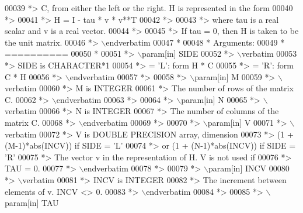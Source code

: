 \begin{DoxyCode}
00039 \textcolor{comment}{*> C, from either the left or the right. H is represented in the form}
00040 \textcolor{comment}{*>}
00041 \textcolor{comment}{*>       H = I - tau * v * v**T}
00042 \textcolor{comment}{*>}
00043 \textcolor{comment}{*> where tau is a real scalar and v is a real vector.}
00044 \textcolor{comment}{*>}
00045 \textcolor{comment}{*> If tau = 0, then H is taken to be the unit matrix.}
00046 \textcolor{comment}{*> \(\backslash\)endverbatim}
00047 \textcolor{comment}{*}
00048 \textcolor{comment}{*  Arguments:}
00049 \textcolor{comment}{*  ==========}
00050 \textcolor{comment}{*}
00051 \textcolor{comment}{*> \(\backslash\)param[in] SIDE}
00052 \textcolor{comment}{*> \(\backslash\)verbatim}
00053 \textcolor{comment}{*>          SIDE is CHARACTER*1}
00054 \textcolor{comment}{*>          = 'L': form  H * C}
00055 \textcolor{comment}{*>          = 'R': form  C * H}
00056 \textcolor{comment}{*> \(\backslash\)endverbatim}
00057 \textcolor{comment}{*>}
00058 \textcolor{comment}{*> \(\backslash\)param[in] M}
00059 \textcolor{comment}{*> \(\backslash\)verbatim}
00060 \textcolor{comment}{*>          M is INTEGER}
00061 \textcolor{comment}{*>          The number of rows of the matrix C.}
00062 \textcolor{comment}{*> \(\backslash\)endverbatim}
00063 \textcolor{comment}{*>}
00064 \textcolor{comment}{*> \(\backslash\)param[in] N}
00065 \textcolor{comment}{*> \(\backslash\)verbatim}
00066 \textcolor{comment}{*>          N is INTEGER}
00067 \textcolor{comment}{*>          The number of columns of the matrix C.}
00068 \textcolor{comment}{*> \(\backslash\)endverbatim}
00069 \textcolor{comment}{*>}
00070 \textcolor{comment}{*> \(\backslash\)param[in] V}
00071 \textcolor{comment}{*> \(\backslash\)verbatim}
00072 \textcolor{comment}{*>          V is DOUBLE PRECISION array, dimension}
00073 \textcolor{comment}{*>                     (1 + (M-1)*abs(INCV)) if SIDE = 'L'}
00074 \textcolor{comment}{*>                  or (1 + (N-1)*abs(INCV)) if SIDE = 'R'}
00075 \textcolor{comment}{*>          The vector v in the representation of H. V is not used if}
00076 \textcolor{comment}{*>          TAU = 0.}
00077 \textcolor{comment}{*> \(\backslash\)endverbatim}
00078 \textcolor{comment}{*>}
00079 \textcolor{comment}{*> \(\backslash\)param[in] INCV}
00080 \textcolor{comment}{*> \(\backslash\)verbatim}
00081 \textcolor{comment}{*>          INCV is INTEGER}
00082 \textcolor{comment}{*>          The increment between elements of v. INCV <> 0.}
00083 \textcolor{comment}{*> \(\backslash\)endverbatim}
00084 \textcolor{comment}{*>}
00085 \textcolor{comment}{*> \(\backslash\)param[in] TAU}

\end{DoxyCode}
